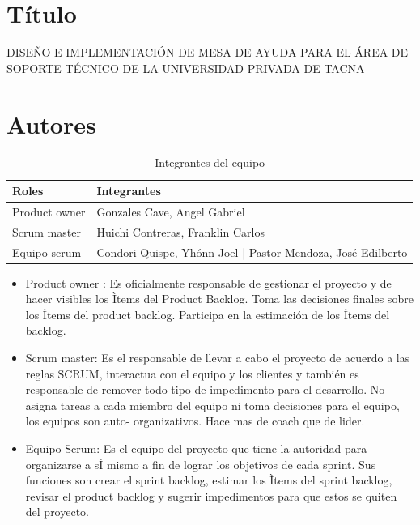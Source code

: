 \documentclass[preprint,12pt]{elsarticle}
\begin{document}

\section{Título}

DISEÑO E IMPLEMENTACIÓN DE MESA DE AYUDA PARA EL ÁREA DE SOPORTE TÉCNICO DE LA UNIVERSIDAD PRIVADA DE TACNA



\section{Autores}

\begin{table}[htbp]
\begin{center}
\begin{tabular}{|l|l|}
\hline
Roles & Integrantes \\
\hline \hline
Product owner & Gonzales Cave, Angel Gabriel \\ \hline
Scrum master & Huichi Contreras, Franklin Carlos  \\ \hline
Equipo scrum & Condori Quispe, Yhónn Joel | Pastor Mendoza, José Edilberto \\ \hline
\end{tabular}
\caption{Integrantes del equipo}
\label{tabla:sencilla}
\end{center}
\end{table}



\begin{itemize}
\item Product owner : Es oficialmente responsable de gestionar el proyecto y de hacer visibles los Ìtems del Product Backlog. Toma las decisiones finales sobre los Ìtems del product backlog. Participa en la estimación de los Ìtems del backlog.
\item Scrum master: Es el responsable de llevar a cabo el proyecto de acuerdo a las reglas SCRUM, interactua con el equipo y los clientes y también es responsable de remover todo tipo de impedimento para el desarrollo. No asigna tareas a cada miembro del equipo ni toma decisiones para el equipo, los equipos son auto- organizativos. Hace mas de coach que de lider.
\item Equipo Scrum: Es el equipo del proyecto que tiene la autoridad para organizarse a sÌ mismo a fin de lograr los objetivos de cada sprint. Sus funciones son crear el sprint backlog, estimar los Ìtems del sprint backlog, revisar el product backlog y sugerir impedimentos para que estos se quiten del proyecto. 
\end{itemize}
\end{document}
